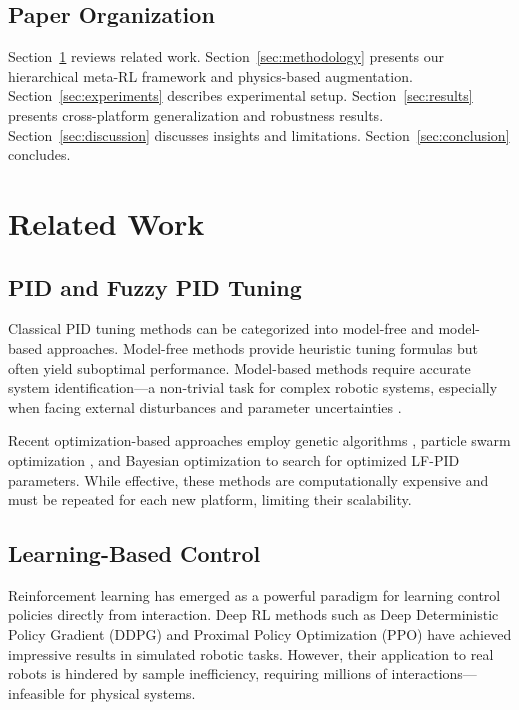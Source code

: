 \documentclass[DTMColor]{ROB-New}
\begin{document}
\subsection{Paper Organization}

Section~\ref{sec:related} reviews related work. Section~\ref{sec:methodology} presents our hierarchical meta-RL framework and physics-based augmentation. Section~\ref{sec:experiments} describes experimental setup. Section~\ref{sec:results} presents cross-platform generalization and robustness results. Section~\ref{sec:discussion} discusses insights and limitations. Section~\ref{sec:conclusion} concludes.

\section{Related Work}
\label{sec:related}

\subsection{PID and Fuzzy PID Tuning}

Classical PID tuning methods can be categorized into model-free and model-based approaches. Model-free methods provide heuristic tuning formulas but often yield suboptimal performance. Model-based methods require accurate system identification—a non-trivial task for complex robotic systems, especially when facing external disturbances and parameter uncertainties \cite{zhang2024disturbance}.

Recent optimization-based approaches employ genetic algorithms \cite{gaing2004particle}, particle swarm optimization \cite{trelea2003particle}, and Bayesian optimization \cite{berkenkamp2016safe} to search for optimized LF-PID parameters. While effective, these methods are computationally expensive and must be repeated for each new platform, limiting their scalability.

\subsection{Learning-Based Control}

Reinforcement learning has emerged as a powerful paradigm for learning control policies directly from interaction. Deep RL methods such as Deep Deterministic Policy Gradient (DDPG) \cite{lillicrap2015continuous} and Proximal Policy Optimization (PPO) \cite{schulman2017proximal} have achieved impressive results in simulated robotic tasks. However, their application to real robots is hindered by sample inefficiency, requiring millions of interactions—infeasible for physical systems.
\end{document}
